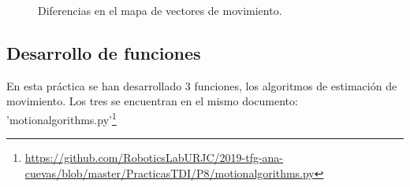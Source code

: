 \begin{figure}[!tbp]
  \centering
  \hfill
  \hfill
  \caption{Diferencias en el mapa de vectores de movimiento.}
  \label{arrow}
\end{figure}
\subsection{Desarrollo de funciones}

En esta práctica se han desarrollado 3 funciones, los algoritmos de estimación de movimiento. Los tres se encuentran en el mismo documento: 'motionalgorithms.py'\footnote{\url{https://github.com/RoboticsLabURJC/2019-tfg-ana-cuevas/blob/master/PracticasTDI/P8/motionalgorithms.py}}\\

